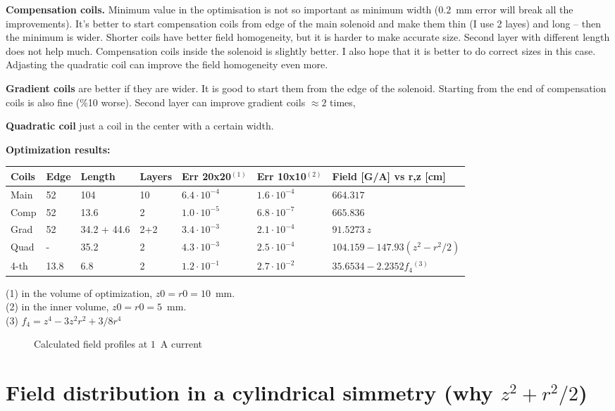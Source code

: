 \documentclass[a4paper]{article}
\newcommand{\image}[3]{
\begin{figure}[#1]
\begin{center}

\caption{\small#3}
\label{image:#2}
\end{center}
\end{figure}
}
\begin{document}
{\bf Compensation coils.} Minimum value in the optimisation is not so
important as minimum width ($0.2$~mm error will break all the
improvements). It's better to start compensation coils from edge of the
main solenoid and make them thin (I use 2 layes) and long -- then the
minimum is wider. Shorter coils have better field homogeneity, but it is
harder to make accurate size. Second layer with different length does not
help much. Compensation coils inside the solenoid is slightly better. I
also hope that it is better to do correct sizes in this case. Adjasting
the quadratic coil can improve the field homogeneity even more.

{\bf Gradient coils} are better if they are wider. It is good to start them
from the edge of the solenoid. Starting from the end of compensation coils
is also fine (\%10 worse). Second layer can improve gradient coils $\approx 2$ times,

{\bf Quadratic coil} just a coil in the center with a certain width.

{\bf Optimization results:}\\
\medskip
\begin{tabular}{lllllll}
Coils & Edge &Length       & Layers & Err 20x20$^{(1)}$  & Err 10x10$^{(2)}$        & Field [G/A] vs r,z [cm] \\\hline
Main  & 52   & 104         & 10     & $6.4\cdot10^{-4}$ & $1.6\cdot10^{-4}$ & $664.317$\\
Comp  & 52   & 13.6        & 2      & $1.0\cdot10^{-5}$ & $6.8\cdot10^{-7}$ & $665.836$\\
Grad  & 52   & 34.2 + 44.6 & 2+2    & $3.4\cdot10^{-3}$ & $2.1\cdot10^{-4}$ & $91.5273\ z$\\
Quad  & -    & 35.2        & 2      & $4.3\cdot10^{-3}$ & $2.5\cdot10^{-4}$ & $104.159 - 147.93 (z^2-r^2/2)$\\
4-th  & 13.8 & 6.8         & 2      & $1.2\cdot10^{-1}$ & $2.7\cdot10^{-2}$ & $35.6534 - 2.2352 f_4$$^{(3)}$\\
\end{tabular}
\medskip

\noindent
(1) in the volume of optimization, $z0=r0=10$~mm.\\
(2) in the inner volume, $z0=r0=5$~mm.\\
(3) $f_4 = z^4 - 3 z^2 r^2 + 3/8 r^4$


\image{h}{fits}{Calculated field profiles at $1$~A current}

\section*{Field distribution in a cylindrical simmetry (why $z^2+r^2/2$)}
\end{document}
